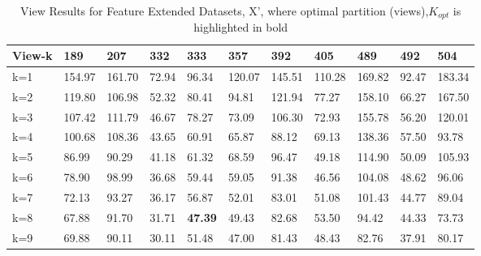 \begin{table*}[]
\centering
\setlength{\tabcolsep}{3pt}
 {\renewcommand{\arraystretch}{1}%
\caption{View Results for Feature Extended Datasets, X', where optimal partition (views),$K_{opt}$ is highlighted in bold }
\label{tab:my-tabletab:my-table}
\begin{tabular}
{p{}p{}p{}p{}p{}p{}p{}p{}p{}p{}p{}}\hline
 \textbf{View-k} & \textbf{189} & \textbf{207} & \textbf{332} & \textbf{333} & \textbf{357} & \textbf{392} & \textbf{405} & \textbf{489} & \textbf{492} & \textbf{504} \\ \hline
k=1         & 154.97       & 161.70       & 72.94        & 96.34      & 120.07       & 145.51       & 110.28       & 169.82       & 92.47        & 183.34       \\
k=2         & 119.80       & 106.98       & 52.32        & 80.41        & 94.81        & 121.94       & 77.27        & 158.10       & 66.27        & 167.50       \\
k=3         & 107.42       & 111.79       & 46.67        & 78.27        & 73.09        & 106.30       & 72.93        & 155.78       & 56.20        & 120.01       \\
k=4         & 100.68       & 108.36       & 43.65        & 60.91        & 65.87        & 88.12        & 69.13        & 138.36       & 57.50        & 93.78        \\
k=5         & 86.99        & 90.29        & 41.18        & 61.32        & 68.59        & 96.47        & 49.18        & 114.90       & 50.09        & 105.93       \\
k=6         & 78.90        & 98.99        & 36.68        & 59.44        & 59.05        & 91.38        & 46.56        & 104.08       & 48.62        & 96.06        \\
k=7         & 72.13        & 93.27        & 36.17        & 56.87        & 52.01        & 83.01        & 51.08        & 101.43       & 44.77        & 89.04        \\
k=8         & 67.88        & 91.70        & 31.71        & \textbf{47.39}        & 49.43        & 82.68        & 53.50        & 94.42        & 44.33        & 73.73        \\
k=9         & 69.88        & 90.11        & 30.11        & 51.48        & 47.00        & 81.43        & 48.43        & 82.76        & 37.91        & 80.17        \\

\end{tabular}}
\end{table*}
